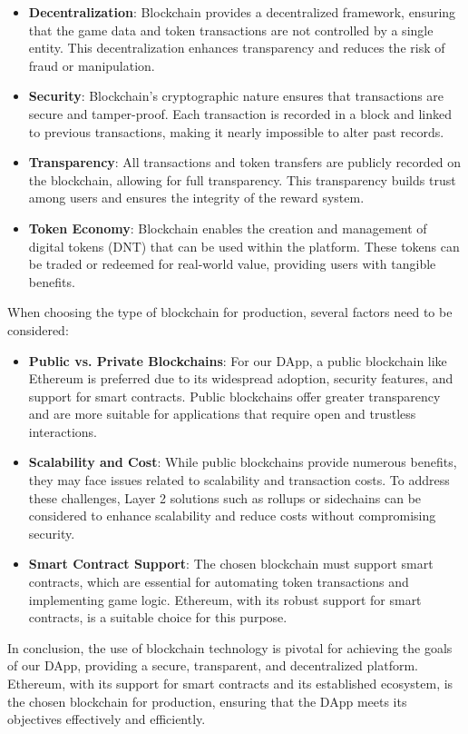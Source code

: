 \documentclass[../main.tex]{subfiles}
\begin{document}
\begin{itemize}
    \item \textbf{Decentralization}: Blockchain provides a decentralized framework, ensuring that the game data and token transactions are not controlled by a single entity. This decentralization enhances transparency and reduces the risk of fraud or manipulation.
    \item \textbf{Security}: Blockchain's cryptographic nature ensures that transactions are secure and tamper-proof. Each transaction is recorded in a block and linked to previous transactions, making it nearly impossible to alter past records.
    \item \textbf{Transparency}: All transactions and token transfers are publicly recorded on the blockchain, allowing for full transparency. This transparency builds trust among users and ensures the integrity of the reward system.
    \item \textbf{Token Economy}: Blockchain enables the creation and management of digital tokens (DNT) that can be used within the platform. These tokens can be traded or redeemed for real-world value, providing users with tangible benefits.
\end{itemize}

When choosing the type of blockchain for production, several factors need to be considered:

\begin{itemize}
    \item \textbf{Public vs. Private Blockchains}: For our DApp, a public blockchain like Ethereum is preferred due to its widespread adoption, security features, and support for smart contracts. Public blockchains offer greater transparency and are more suitable for applications that require open and trustless interactions.
    \item \textbf{Scalability and Cost}: While public blockchains provide numerous benefits, they may face issues related to scalability and transaction costs. To address these challenges, Layer 2 solutions such as rollups or sidechains can be considered to enhance scalability and reduce costs without compromising security.
    \item \textbf{Smart Contract Support}: The chosen blockchain must support smart contracts, which are essential for automating token transactions and implementing game logic. Ethereum, with its robust support for smart contracts, is a suitable choice for this purpose.
\end{itemize}

In conclusion, the use of blockchain technology is pivotal for achieving the goals of our DApp, providing a secure, transparent, and decentralized platform. Ethereum, with its support for smart contracts and its established ecosystem, is the chosen blockchain for production, ensuring that the DApp meets its objectives effectively and efficiently.
\end{document}
